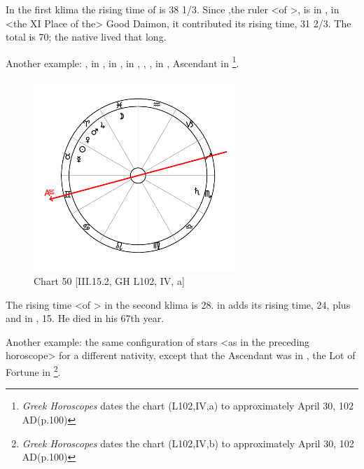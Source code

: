 In the first klima the rising time of \Virgo\xspace is 38 1/3. Since \Mercury,the ruler <of \Virgo>, is in \Cancer, in <the XI Place of the> Good Daimon, it contributed its rising time, 31 2/3. The total is 70; the native lived that long.

\newpage
Another example: \Sun, \Mercury\xspace in \Taurus, \Moon\xspace in \Pisces, \Saturn\xspace in \Scorpio, \Jupiter, \Mars, \Venus in \Aries, Ascendant in \Gemini
\footnote{\textit{Greek Horoscopes} dates the chart (L102,IV,a) to approximately April 30, 102 AD(p.100)}.

\clearpage
\begin{figure}
\centering
\vspace{-20pt}
\includegraphics[width=0.68\textwidth]{charts/3_15_2}
\caption{Chart 50 [III.15.2, GH L102, IV, a]}
\label{fig:chart50}
\end{figure} 

The rising time <of \Gemini> in the second klima is 28. \Mercury\xspace in \Taurus\xspace adds its rising time, 24, plus \Mars\xspace and \Venus\xspace in \Aries, 15. He died in his 67th year.

\newpage
Another example: the same configuration of stars <as in the preceding horoscope> for a different nativity, except that the Ascendant was in \Capricorn, the Lot of Fortune in \Pisces
\footnote{\textit{Greek Horoscopes} dates the chart (L102,IV,b) to approximately April 30, 102 AD(p.100)}.

